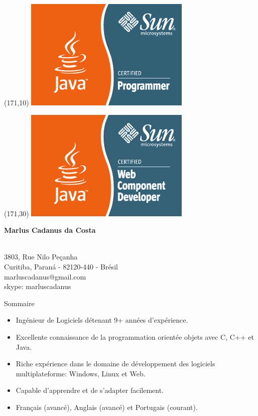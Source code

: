 \documentclass{resume}
\begin{document}
 \begin{textblock}{20}(171,10)
    \includegraphics{java-certified-programmer}
 \end{textblock}

 \begin{textblock}{20}(171,30)
    \includegraphics{java-certified-web}
 \end{textblock}

\begin{center}
  {\fontsize{16}{18} \bf Marlus Cadanus da Costa} \\\\
\end{center}
\begin{center}
  {\fontsize{12}{14} 3803, Rue Nilo Peçanha} \\ 
  {\fontsize{12}{14} Curitiba, Paraná - 82120-440 - Brésil} \\
  {\fontsize{12}{14} marluscadanus@gmail.com} \\
  {\fontsize{12}{14} skype: marluscadanus}
\end{center}

  \begin{rSection}{Sommaire}
  \end{rSection}

    \begin{itemize}
       \item Ingénieur de Logiciels détenant 9+ années d’expérience.
       \item Excellente connaissance de la programmation orientée objets avec C, C++ et Java.
       \item Riche expérience dans le domaine de développement des logiciels multiplateforme: Windows, Linux et Web.
       \item Capable d'apprendre et de s'adapter facilement.
       \item Français (avancé), Anglais (avancé) et Portugais (courant).
    \end{itemize}
\end{document}
